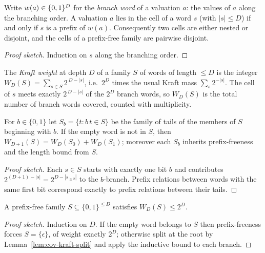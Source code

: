 \begin{lemma}\label{lem:cov-cell-prefix}
Write $w(a) \in \{0,1\}^{D}$ for the \emph{branch word} of a valuation $a$:
the values of $a$ along the branching order.  A valuation $a$ lies in the
cell of a word $s$ (with $|s| \le D$) if and only if $s$ is a prefix of
$w(a)$.  Consequently two cells are either nested or disjoint, and the
cells of a prefix-free family are pairwise disjoint.
\leanok
{}
\end{lemma}
\begin{proof}[Proof sketch]
Induction on $s$ along the branching order.
\end{proof}

\begin{definition}\label{def:cov-kraft}
The \emph{Kraft weight} at depth $D$ of a family $S$ of words of length
$\le D$ is the integer
$W_D(S) = \sum_{s \in S} 2^{\,D - |s|}$,
i.e.\ $2^D$ times the usual Kraft mass $\sum_s 2^{-|s|}$.  The cell of $s$
meets exactly $2^{\,D-|s|}$ of the $2^D$ branch words, so $W_D(S)$ is the
total number of branch words covered, counted with multiplicity.
\leanok
{}
\end{definition}

\begin{lemma}\label{lem:cov-kraft-split}
For $b \in \{0,1\}$ let $S_b = \{ t : b\,t \in S \}$ be the family of tails
of the members of $S$ beginning with $b$.  If the empty word is not in $S$,
then
$W_{D+1}(S) = W_D(S_0) + W_D(S_1)$;
moreover each $S_b$ inherits prefix-freeness and the length bound from $S$.
\leanok
{}
\end{lemma}
\begin{proof}[Proof sketch]
Each $s \in S$ starts with exactly one bit $b$ and contributes
$2^{(D+1)-|s|} = 2^{D-|s_{\ge 2}|}$ to the $b$-branch.  Prefix relations
between words with the same first bit correspond exactly to prefix
relations between their tails.
\end{proof}

\begin{lemma}\label{lem:cov-kraft-ineq}
A prefix-free family $S \subseteq \{0,1\}^{\le D}$ satisfies
$W_D(S) \le 2^D$.
\leanok
{}
\end{lemma}
\begin{proof}[Proof sketch]
Induction on $D$.  If the empty word belongs to $S$ then prefix-freeness
forces $S = \{\epsilon\}$, of weight exactly $2^D$; otherwise split at the
root by Lemma~\ref{lem:cov-kraft-split} and apply the inductive bound to
each branch.
\end{proof}

